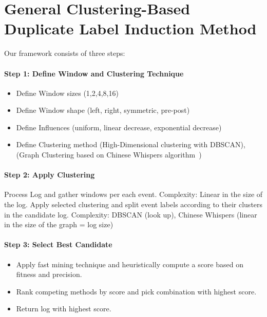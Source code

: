 \section{General Clustering-Based Duplicate Label Induction Method}
\label{sec:concept}

Our framework consists of three steps: 

\paragraph{Step 1: Define Window and Clustering Technique}
\begin{itemize}
	\item Define Window sizes (1,2,4,8,16)
	\item Define Window shape (left, right, symmetric, pre-post)
	\item Define Influences (uniform, linear decrease, exponential decrease)
	\item Define Clustering method (High-Dimensional clustering with DBSCAN), (Graph Clustering based on Chinese Whispers algorithm~\cite{biemann2006chinese})
\end{itemize}

\paragraph{Step 2: Apply Clustering}
Process Log and gather windows per each event. Complexity: Linear in the size of the log.
Apply selected clustering and split event labels according to their clusters in the candidate log. Complexity: DBSCAN (look up), Chinese Whispers (linear in the size of the graph = log size)

\paragraph{Step 3: Select Best Candidate }
\begin{itemize}
	\item Apply fast mining technique and heuristically compute a score based on fitness and precision.
	\item Rank competing methods by score and pick combination with highest score.
	\item Return log with highest score.
\end{itemize}
